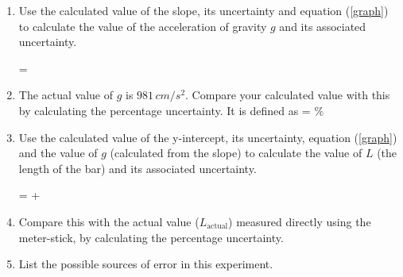    \begin{enumerate}

      \item Use the calculated value of the slope, its uncertainty and equation (\ref{graph}) to calculate the value of the acceleration of gravity $g$ and its associated uncertainty.

         \beqn
             = 
         \eeqn
      
      \item The actual value of $g$ is $981 \, cm/s^2$. Compare your calculated value with this by calculating the percentage uncertainty. It is defined as
      \beq
       =   \%
      \eeq

   \item Use the calculated value of the y-intercept, its uncertainty, equation (\ref{graph}) and the value of $g$ (calculated from the slope) to calculate the value of $L$ (the length of the bar) and its associated uncertainty.

         \beqn
             =   +  
         \eeqn

      \item Compare this with the actual value ($L_\text{actual}$) measured directly using the meter-stick, by calculating the percentage uncertainty.

      \item List the possible sources of error in this experiment.

\end{enumerate}
